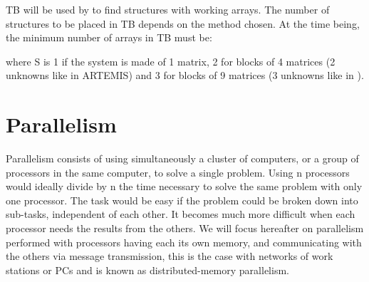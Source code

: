 TB will be used by  to find  structures with
working arrays. The number of structures to be placed in TB depends on the
method chosen. At the time being, the minimum number of arrays in TB must be:

 where S is 1 if the system is made of 1
  matrix, 2 for blocks of 4 matrices (2 unknowns like in ARTEMIS) and 3 for
  blocks of 9 matrices (3 unknowns like in ).

\section{Parallelism}

Parallelism consists of using simultaneously a cluster of computers, or a group
of processors in the same computer, to solve a single problem. Using n
processors would ideally divide by n the time necessary to solve the same
problem with only one processor. The task would be easy if the problem could be
broken down into sub-tasks, independent of each other. It becomes much more
difficult when each processor needs the results from the others. We will focus
hereafter on parallelism performed with processors having each its own memory,
and communicating with the others via message transmission, this is the case
with networks of work stations or PCs and is known as distributed-memory
parallelism.

